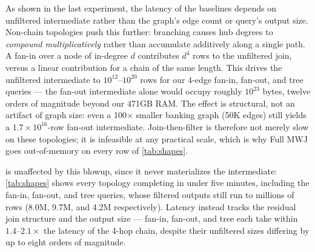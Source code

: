 
As shown in the last experiment, the latency of the baselines depends on unfiltered
intermediate rather than the graph's edge count or query's output size. Non-chain
topologies push this further: branching causes hub degrees to
\emph{compound multiplicatively} rather than accumulate additively along a
single path. A fan-in over a node of in-degree $d$ contributes $d^4$ rows
to the unfiltered join, versus a linear contribution for a chain of the
same length. This drives the unfiltered intermediate to $10^{12}$--$10^{20}$
rows for our 4-edge fan-in, fan-out, and tree queries --- the fan-out
intermediate alone would occupy roughly $10^{23}$ bytes, twelve orders of
magnitude beyond our 471GB RAM. The effect is structural, not an
artifact of graph size: even a 100$\times$ smaller banking graph (50K
edges) still yields a $1.7{\times}10^{16}$-row fan-out intermediate.
Join-then-filter is therefore not merely slow on these topologies; it is
infeasible at any practical scale, which is why Full MWJ goes out-of-memory
on every row of \cref{tab:shapes}.

\system is unaffected by this blowup, since it never materializes the
intermediate: \cref{tab:shapes} shows every topology completing in under
five minutes, including the fan-in, fan-out, and tree queries, whose
filtered outputs still run to millions of rows (8.0M, 9.7M, and 4.2M
respectively). Latency instead tracks the residual join structure and the
output size --- fan-in, fan-out, and tree each take within
$1.4$--$2.1\times$ the latency of the 4-hop chain, despite their unfiltered
sizes differing by up to eight orders of magnitude.

